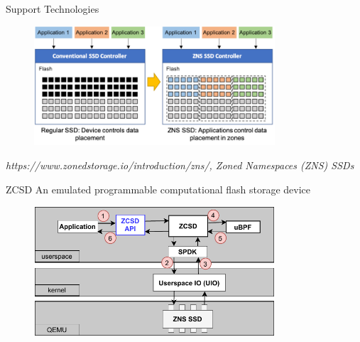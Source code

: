 \documentclass{beamer}
\begin{document}
\begin{frame}{Support Technologies}
	\begingroup
	\small %
	\begin{figure}
	   \centering
	   \includegraphics[width=0.8\textwidth]{resources/images/intro-zns}
	\end{figure}
	\textit{
		\tiny https://www.zonedstorage.io/introduction/zns/,
		Zoned Namespaces (ZNS) SSDs
	}
	\endgroup
\end{frame}

\begin{frame}{ZCSD}
	\begingroup
	\small An emulated programmable computational flash storage device
	\begin{figure}
		\centering
		\includegraphics[width=0.8\textwidth]{resources/images/zcsd-arch-final}
	\end{figure}
	\endgroup
\end{frame}
\end{document}
